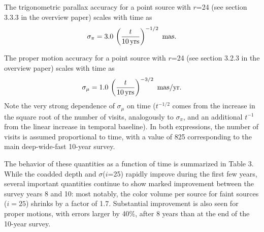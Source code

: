 \documentclass[DM,lsstdraft,toc,usenatbib]{lsstdoc}
\begin{document}
The trigonometric parallax accuracy for a point source with $r$=24 (see section 3.3.3 in the 
overview paper) scales with time as 
\begin{equation}
        \sigma_\pi = 3.0 \,  \left({t \over 10 \, {\rm yrs}}\right)^{-1/2}  \,\,  {\rm mas.} 
\end{equation}

The proper motion accuracy for a point source with $r$=24 (see section 3.2.3 in the overview paper)
scales with time as 
\begin{equation}
        \sigma_\mu = 1.0 \,  \left({t \over 10 \, {\rm yrs}}\right)^{-3/2}   \,\, {\rm mas/yr.} 
\end{equation}
Note the very strong dependence of  $\sigma_\mu$ on time ($t^{-1/2}$ comes from the
increase in the square root of the number of visits, analogously to $\sigma_\pi$, and 
an additional $t^{-1}$ from the linear increase in temporal baseline).  In both expressions,
the number of visits is assumed proportional to time, with a value of 825 corresponding to the 
main deep-wide-fast 10-year survey. 

The behavior of these quantities as a function of time is summarized in Table 3. While 
the coadded depth and $\sigma$($i$=25) rapidly improve during the first few years, 
several important quantities continue to show marked improvement between the survey 
years 8 and 10: most notably, the color volume per source for faint sources ($i=25$) 
shrinks by a factor of 1.7.  Substantial improvement is also seen for proper motions, 
with errors larger by 40\%, after 8 years than at the end of the 10-year survey.  
\end{document}
